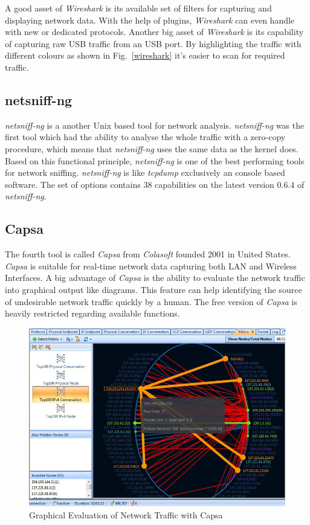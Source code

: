 \documentclass[conference]{IEEEtran}
\begin{document}
A good asset of \textit{Wireshark} is its available set of filters for capturing and displaying network data. With the help of plugins, \textit{Wireshark} can even handle with new or dedicated protocols. Another big asset of \textit{Wireshark} is its capability of capturing raw USB traffic from an USB port. By highlighting the traffic with different colours as shown in Fig.~\ref{wireshark} it's easier to scan for required traffic.

\subsection*{netsniff-ng}

\textit{netsniff-ng} is a another Unix based tool for network analysis. \textit{netsniff-ng} was the first tool which had the ability to analyse the whole traffic with a zero-copy procedure, which means that \textit{netsniff-ng} uses the same data as the kernel does. Based on this functional principle, \textit{netsniff-ng} is one of the best performing tools for network sniffing. \textit{netsniff-ng} is like \textit{tcpdump} exclusively an console based software. The set of options contains 38 capabilities on the latest version 0.6.4 of \textit{netsniff-ng}.

\subsection*{Capsa}

The fourth tool is called \textit{Capsa} from \textit{Colasoft} founded 2001 in United States. \textit{Capsa} is suitable for real-time network data capturing both LAN and Wireless Interfaces. A big advantage of \textit{Capsa} is the ability to evaluate the network traffic into graphical output like diagrams. This feature can help identifying the source of undesirable network traffic quickly by a human. The free version of \textit{Capsa} is heavily restricted regarding available functions. 

\begin{figure}[htbp]
\centerline{\includegraphics[scale=0.30]{capsa.png}}
\caption{Graphical Evaluation of Network Traffic with Capsa \cite{firewallcx}}
\label{capsa}
\end{figure}
\end{document}

